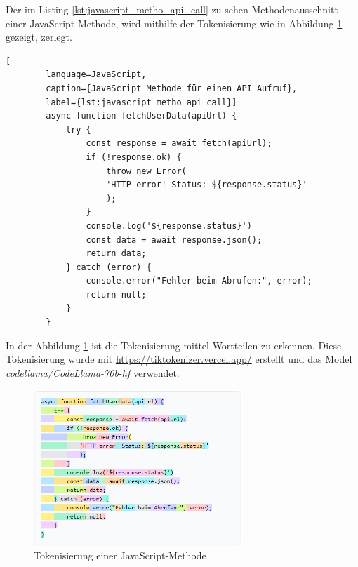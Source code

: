 Der im Listing \ref{lst:javascript_metho_api_call} zu sehen Methodenausschnitt einer JavaScript-Methode, wird mithilfe der Tokenisierung wie in Abbildung \ref{img:tokenize_javascript_method} gezeigt, zerlegt.

\begin{center}
	\begin{lstlisting}[
		language=JavaScript,
		caption={JavaScript Methode für einen API Aufruf},
		label={lst:javascript_metho_api_call}]
		async function fetchUserData(apiUrl) {
			try {
				const response = await fetch(apiUrl);
				if (!response.ok) {
					throw new Error(
					'HTTP error! Status: ${response.status}'
					);
				}
				console.log('${response.status}')
				const data = await response.json();
				return data;
			} catch (error) {
				console.error("Fehler beim Abrufen:", error);
				return null;
			}
		}
	\end{lstlisting}
\end{center}

In der Abbildung \ref{img:tokenize_javascript_method} ist die Tokenisierung mittel Wortteilen zu erkennen. Diese Tokenisierung wurde mit \href{https://tiktokenizer.vercel.app/}{https://tiktokenizer.vercel.app/} erstellt und das Model \textit{codellama/CodeLlama-70b-hf} verwendet.

\begin{center}
	\begin{figure}[!ht]
		\includegraphics[width=0.7\textwidth]{content/chapter_basics/images/tokenize.png}
		\centering
		\caption{Tokenisierung einer JavaScript-Methode}
		\label{img:tokenize_javascript_method}
	\end{figure}
\end{center}

